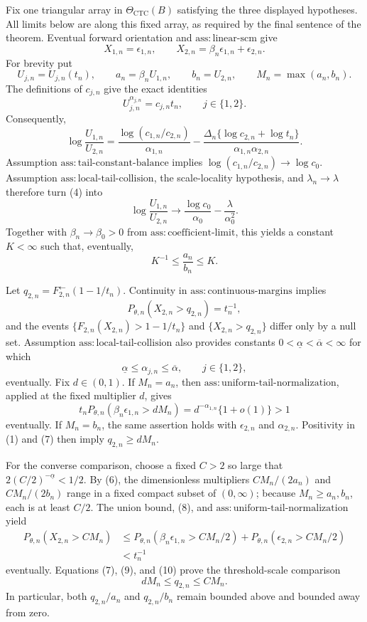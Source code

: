 Fix one triangular array in \(\Theta_{\mathrm{CTC}}(B)\) satisfying the three displayed hypotheses.  All limits below are along this fixed array, as required by the final sentence of the theorem.  Eventual forward orientation and \(\mathrm{ass{:}linear\text{-}scm}\) give
\[
X_{1,n}=\epsilon_{1,n},\qquad X_{2,n}=\beta_n\epsilon_{1,n}+\epsilon_{2,n}.
\tag{1}
\]
For brevity put
\[
U_{j,n}=U_{j,n}(t_n),\qquad a_n=\beta_nU_{1,n},\qquad b_n=U_{2,n},\qquad M_n=\max(a_n,b_n).
\tag{2}
\]
The definitions of \(c_{j,n}\) give the exact identities
\[
U_{j,n}^{\alpha_{j,n}}=c_{j,n}t_n,\qquad j\in\{1,2\}.
\tag{3}
\]
Consequently,
\[
\log\frac{U_{1,n}}{U_{2,n}}
=\frac{\log(c_{1,n}/c_{2,n})}{\alpha_{1,n}}
-\frac{\Delta_n\{\log c_{2,n}+\log t_n\}}
{\alpha_{1,n}\alpha_{2,n}}.
\tag{4}
\]
Assumption \(\mathrm{ass{:}tail\text{-}constant\text{-}balance}\) implies \(\log(c_{1,n}/c_{2,n})\to\log c_0\).  Assumption \(\mathrm{ass{:}local\text{-}tail\text{-}collision}\), the scale-locality hypothesis, and \(\lambda_n\to\lambda\) therefore turn (4) into
\[
\log\frac{U_{1,n}}{U_{2,n}}
\longrightarrow \frac{\log c_0}{\alpha_0}-\frac{\lambda}{\alpha_0^2}.
\tag{5}
\]
Together with \(\beta_n\to\beta_0>0\) from \(\mathrm{ass{:}coefficient\text{-}limit}\), this yields a constant \(K<\infty\) such that, eventually,
\[
K^{-1}\leq \frac{a_n}{b_n}\leq K.
\tag{6}
\]

Let \(q_{2,n}=F_{2,n}^{\leftarrow}(1-1/t_n)\).  Continuity in \(\mathrm{ass{:}continuous\text{-}margins}\) implies
\[
P_{\theta,n}(X_{2,n}>q_{2,n})=t_n^{-1},
\tag{7}
\]
and the events \(\{F_{2,n}(X_{2,n})>1-1/t_n\}\) and \(\{X_{2,n}>q_{2,n}\}\) differ only by a null set.  Assumption \(\mathrm{ass{:}local\text{-}tail\text{-}collision}\) also provides constants \(0<\underline\alpha<\overline\alpha<\infty\) for which
\[
\underline\alpha\leq\alpha_{j,n}\leq\overline\alpha,\qquad j\in\{1,2\},
\tag{8}
\]
eventually.  Fix \(d\in(0,1)\).  If \(M_n=a_n\), then \(\mathrm{ass{:}uniform\text{-}tail\text{-}normalization}\), applied at the fixed multiplier \(d\), gives
\[
t_nP_{\theta,n}(\beta_n\epsilon_{1,n}>dM_n)
=d^{-\alpha_{1,n}}\{1+o(1)\}>1
\tag{9}
\]
eventually.  If \(M_n=b_n\), the same assertion holds with \(\epsilon_{2,n}\) and \(\alpha_{2,n}\).  Positivity in (1) and (7) then imply \(q_{2,n}\geq dM_n\).

For the converse comparison, choose a fixed \(C>2\) so large that \(2(C/2)^{-\underline\alpha}<1/2\).  By (6), the dimensionless multipliers \(CM_n/(2a_n)\) and \(CM_n/(2b_n)\) range in a fixed compact subset of \((0,\infty)\); because \(M_n\geq a_n,b_n\), each is at least \(C/2\).  The union bound, (8), and \(\mathrm{ass{:}uniform\text{-}tail\text{-}normalization}\) yield
\[
\begin{split}
P_{\theta,n}(X_{2,n}>CM_n)
&\leq P_{\theta,n}(\beta_n\epsilon_{1,n}>CM_n/2)
+P_{\theta,n}(\epsilon_{2,n}>CM_n/2)\\
&<t_n^{-1}
\end{split}
\tag{10}
\]
eventually.  Equations (7), (9), and (10) prove the threshold-scale comparison
\[
dM_n\leq q_{2,n}\leq CM_n.
\tag{11}
\]
In particular, both \(q_{2,n}/a_n\) and \(q_{2,n}/b_n\) remain bounded above and bounded away from zero.

